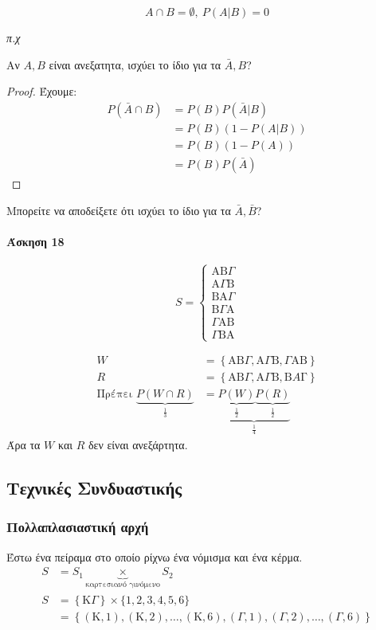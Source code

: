 \documentclass[11pt,a4paper,titlepage,draft]{article}
\begin{document}
\[A \cap B = \emptyset,\ P(A|B)=0\]

\textit{π.χ}

Αν \(A,B\) είναι ανεξατητα, ισχύει το ίδιο για τα \(\bar A,B\)?
\begin{proof}
Έχουμε:
\begin{align*}
P(\bar{A}\cap B)
&=
P(B)P(\bar A | B)
\\ &=
P(B) \left( 1 - P(A|B) \right)
\\ &=
P(B) \left( 1-P(A) \right)
\\ &=
P(B)P(\bar A)
\end{align*}
\end{proof}

Μπορείτε να αποδείξετε ότι ισχύει το ίδιο για τα \(\bar A, \bar B\)?

\paragraph{Άσκηση 18}
\[ S =
\begin{cases}
\mathrm A \mathrm B  \Gamma \\ \mathrm A  \Gamma \mathrm B \\\mathrm B \mathrm A  \Gamma \\\mathrm B  \Gamma \mathrm A \\ \Gamma \mathrm A \mathrm B \\ \Gamma \mathrm B \mathrm A 
\end{cases}
\]

\begin{align*}
W &=  \left\lbrace \mathrm A \mathrm B \Gamma , \mathrm A  \Gamma \mathrm B,  \Gamma \mathrm A \mathrm B  \right\rbrace \\
R &=  \left\lbrace \mathrm{A} \mathrm{B} \Gamma , \mathrm A  \Gamma  \mathrm B, \mathrm B A \mathrm  \Gamma  \right\rbrace \\
\text{Πρέπει } \underbrace{P(W \cap R)}_\frac{1}{3} &= 
\underbrace
{
\underbrace{P(W)}_\frac{1}{2}
\underbrace{P(R)}_\frac{1}{2}
}
_\frac{1}{4}
\end{align*}
Άρα τα \(W\) και \(R\) δεν είναι ανεξάρτητα.

\subsection{Τεχνικές Συνδυαστικής}

\subsubsection{Πολλαπλασιαστική αρχή}
Έστω ένα πείραμα στο οποίο ρίχνω ένα νόμισμα και ένα κέρμα.
\begin{align*}
S &= S_1 \underbrace{\times}_\text{καρτεσιανό γινόμενο} S_2 \\
S &=  \left\lbrace \mathrm K  \Gamma  \right\rbrace \times \lbrace 1,2,3,4,5,6 \rbrace \\
&=  \left\lbrace  \left( \mathrm K,1 \right), \left( \mathrm K,2 \right), \dots,  \left( \mathrm K,6  \right), \left(  \Gamma ,1 \right), \left(  \Gamma ,2 \right),\dots, \left(  \Gamma ,6 \right) \right\rbrace
\end{align*}
\end{document}
